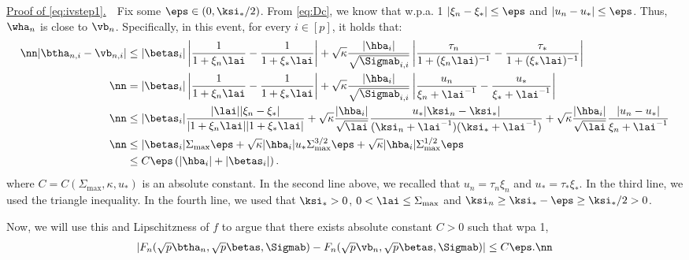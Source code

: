 \vspace{2pt}
\noindent\underline{Proof of \eqref{eq:ivstep1}.}~~Fix some $\eps\in(0,\ksi_*/2)$. From \eqref{eq:Dc}, we know that w.p.a. 1 $|\xi_n-\xi_*|\leq \eps$ and $|u_n-u_*|\leq \eps$. Thus, $\wha_n$ is close to $\vb_n$. Specifically, in this event, for every $i\in[p]$, it holds that:
\begin{align}
\nn|\btha_{n,i} - \vb_{n,i}| &\leq {|\betas_i|}\left|\frac{1}{1+\xi_n\lai}-\frac{1}{1+\xi_*\lai}\right| + \sqrt{\kappa}\frac{|\hba_i|}{\sqrt{\Sigmab_{i,i}}}\left|\frac{\tau_n}{1+(\xi_n\lai)^{-1}}-\frac{\tau_*}{1+(\xi_*\lai)^{-1}}\right| \\
\nn&= {|\betas_i|}\left|\frac{1}{1+\xi_n\lai}-\frac{1}{1+\xi_*\lai}\right| + \sqrt{\kappa}\frac{|\hba_i|}{\sqrt{\Sigmab_{i,i}}}\left|\frac{u_n}{\xi_n+\lai^{-1}}-\frac{u_*}{\xi_*+\lai^{-1}}\right| \\
\nn& \leq
{|\betas_i|}\frac{|\lai||\xi_n-\xi_*|}{|1+\xi_n\lai||1+\xi_*\lai|} + \sqrt{\kappa}\frac{|\hba_i|}{\sqrt{\lai}}  \frac{u_*|\ksi_n-\ksi_*|}{(\ksi_n+\lai^{-1})(\ksi_*+\lai^{-1})} + 
\sqrt{\kappa}\frac{|\hba_i|}{\sqrt{\lai}}\frac{|u_n-u_*|}{\xi_n+\lai^{-1}}
\\
\nn& \leq
{|\betas_i|}{\Sigma_{\max}\eps} + \sqrt{\kappa}{|\hba_i|} u_*\Sigma_{\max}^{3/2} \eps+ 
\sqrt{\kappa}|\hba_i|\Sigma_{\max}^{1/2}\eps
\\
&\leq C\eps  \left(|\hba_i| + |\betas_i|\right).\label{eq:betav}
\end{align}%
where $C=C(\Sigma_{\max},\kappa,u_*)$ is an absolute constant. In the second line above, we recalled that $u_n=\tau_n\xi_n$ and $u_*=\tau_*\xi_*$. In the third line, we used the triangle inequality. In the fourth line, we used that $\ksi_*>0$, $0<\lai\leq\Sigma_{\max}$ and $\ksi_n\geq \ksi_*-\eps \geq \ksi_*/2 >0$. 

Now, we will use this and Lipschitzness of $f$ to argue that there exists absolute constant $C>0$ such that wpa 1,
\begin{align}
|F_n(\sqrt{p}\btha_n,\sqrt{p}\betas,\Sigmab) - F_n(\sqrt{p}\vb_n,\sqrt{p}\betas,\Sigmab) | \leq C\eps.\nn
\end{align}

